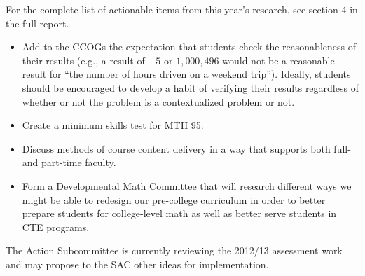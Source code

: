 \begin{description}
For the complete list of actionable items from this year's research, see section
4 in the full report. 

\begin{itemize}
\item Add to the CCOGs the expectation that students check the reasonableness of
  their results (e.g., a result of $-5$ or $1{,}000{,}496$ would not be a
  reasonable result for ``the number of hours driven on a weekend trip'').
  Ideally, students should be encouraged to develop a habit of verifying their
  results regardless of whether or not the problem is a contextualized problem
  or not.
\item Create a minimum skills test for MTH 95.
\item Discuss methods of course content delivery in a way that supports both
  full- and part-time faculty.
\item Form a Developmental Math Committee that will research different ways we
  might be able to redesign our pre-college curriculum in order to better
  prepare students for college-level math as well as better serve students in
  CTE programs.
\end{itemize}

\end{description}

The Action Subcommittee is currently reviewing the 2012/13 assessment work and
may propose to the SAC other ideas for implementation.
